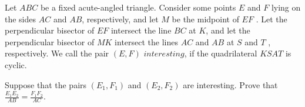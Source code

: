 Let 
$ABC$
 be a fixed acute-angled triangle. Consider some points 
$E$
 and 
$F$
 lying on the sides 
$AC$
 and 
$AB$, 
 respectively, and let 
$M$
 be the midpoint of 
$EF$
 . Let the perpendicular bisector of 
$EF$
 intersect the line 
$BC$
 at 
$K$, 
 and let the perpendicular bisector of 
$MK$
 intersect the lines 
$AC$
 and 
$AB$
 at 
$S$
 and 
$T$
 , respectively. We call the pair 
$(E, F )$
$\textit{interesting}$, 
 if the quadrilateral 
$KSAT$
 is cyclic.

Suppose that the pairs 
$(E_1, F_1)$
 and 
$(E_2, F_2)$
 are interesting. Prove that 
$\displaystyle\frac{E_1 E_2}{AB}=\frac{F_1 F_2}{AC}$.
